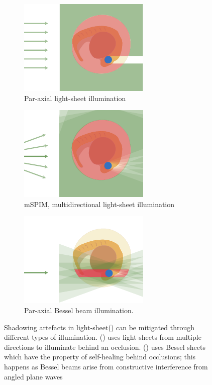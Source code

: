 \begin{figure}
	\centering
    \begin{subfigure}[t]{0.25\textwidth}
        \centering
        \includegraphics{exotic_beams_cartoon_para}
        \caption{Par-axial \gls{light-sheet} illumination}\label{fig:exotic_beams_cartoon_para}
    \end{subfigure}
    \hfill
    \begin{subfigure}[t]{0.25\textwidth}
        \centering
        \includegraphics{exotic_beams_cartoon_mspim}
        \caption{\gls{mSPIM}, multidirectional \gls{light-sheet} illumination}\label{fig:exotic_beams_cartoon_mspim}
    \end{subfigure}
    \hfill
    \begin{subfigure}[t]{0.25\textwidth}
        \centering
        \includegraphics{exotic_beams_cartoon_exotic}
        \caption{Par-axial Bessel beam illumination.}\label{fig:exotic_beams_cartoon_exotic}
    \end{subfigure}
    \caption{Shadowing artefacts in light-sheet() can be mitigated through different types of illumination.
    () uses \gls{light-sheet}s from multiple directions to illuminate behind an occlusion.
    () uses Bessel sheets which have the property of self-healing behind occlusions; this happens as Bessel beams arise from constructive interference from angled plane waves%
    }
    \label{fig:scatteringandshadowing}
\end{figure}

